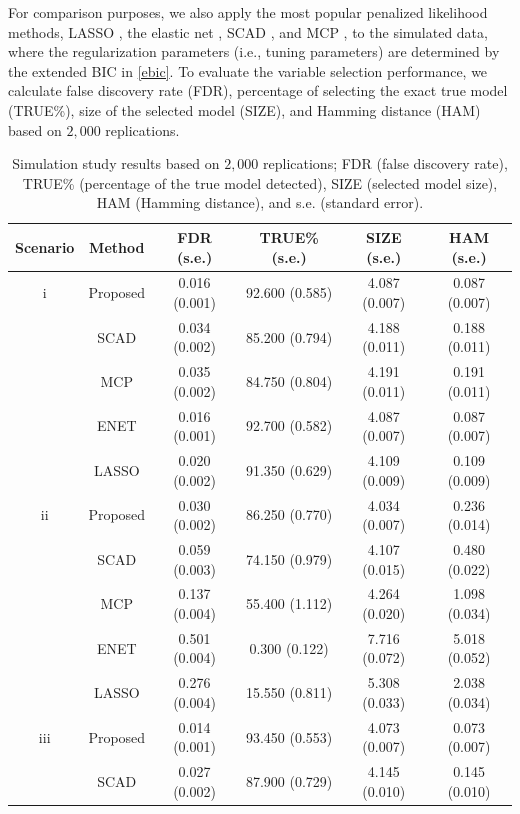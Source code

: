 \documentclass[12pt]{article}
\begin{document}
For comparison purposes, we also apply the most popular penalized likelihood methods, LASSO \citep{tibshirani1996regression}, the elastic net \citep{zou2005regularization}, SCAD \citep{fan2001variable}, and MCP \citep{zhang2010nearly}, to the simulated data, where the regularization parameters (i.e., tuning parameters) are determined by the extended BIC in \eqref{ebic}. To evaluate the variable selection performance, we calculate false discovery rate (FDR), percentage of selecting the exact true model (TRUE\%), size of the selected model (SIZE), and Hamming distance (HAM) based on $2,000$ replications.


\begin{table}[H]
  \centering
  \caption{Simulation study results based on $2,000$ replications; FDR (false discovery rate), TRUE\% (percentage of the true model detected), SIZE (selected model size), HAM (Hamming distance), and s.e. (standard error).}\label{T:sim1}
  \begin{tabular}{cc|c|c|c|c}
    \hline
    Scenario&Method&FDR  (s.e.) & TRUE\% (s.e.) & SIZE (s.e.) & HAM (s.e.)  \\
    \hline
i&Proposed & 0.016 (0.001) & 92.600 (0.585)& 4.087 (0.007) & 0.087 (0.007) \\ 
    &SCAD & 0.034 (0.002) &  85.200 (0.794) & 4.188 (0.011) & 0.188 (0.011)\\ 
   &MCP & 0.035 (0.002) & 84.750 (0.804) & 4.191 (0.011) & 0.191 (0.011)\\ 
  &ENET & 0.016 (0.001) & 92.700 (0.582) & 4.087 (0.007) & 0.087 (0.007)\\ 
  &LASSO & 0.020 (0.002) & 91.350 (0.629) & 4.109 (0.009) & 0.109 (0.009)\\
    \hline
    ii&Proposed & 0.030 (0.002) & 86.250 (0.770) & 4.034 (0.007) & 0.236 (0.014)   \\
&SCAD & 0.059 (0.003) & 74.150 (0.979) & 4.107 (0.015) & 0.480 (0.022) \\ 
  &MCP & 0.137 (0.004) & 55.400 (1.112) & 4.264 (0.020) & 1.098 (0.034) \\ 
  &ENET & 0.501 (0.004) & 0.300 (0.122) & 7.716 (0.072) & 5.018 (0.052) \\ 
  &LASSO & 0.276 (0.004) & 15.550 (0.811) & 5.308 (0.033) & 2.038 (0.034) \\ 
    \hline
    iii&Proposed&0.014 (0.001) & 93.450 (0.553) & 4.073 (0.007) & 0.073 (0.007)\\
&SCAD & 0.027 (0.002) & 87.900 (0.729) & 4.145 (0.010) & 0.145 (0.010) \\ 

\end{tabular}
\end{table}
\end{document}
